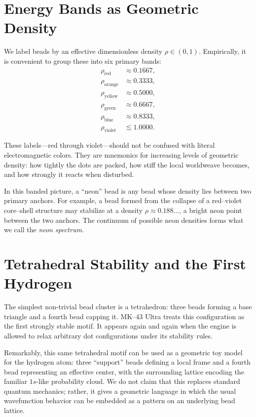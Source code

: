 \section{Energy Bands as Geometric Density}
We label beads by an effective dimensionless density $\rho \in (0,1)$.
Empirically, it is convenient to group these into six primary bands:
\begin{align}
\rho_{\text{red}} &\approx 0.1667,\\
\rho_{\text{orange}} &\approx 0.3333,\\
\rho_{\text{yellow}} &\approx 0.5000,\\
\rho_{\text{green}} &\approx 0.6667,\\
\rho_{\text{blue}} &\approx 0.8333,\\
\rho_{\text{violet}} &\lesssim 1.0000.
\end{align}

These labels---red through violet---should not be confused with literal
electromagnetic colors. They are mnemonics for increasing levels of geometric
density: how tightly the dots are packed, how stiff the local worldweave
becomes, and how strongly it reacts when disturbed.

In this banded picture, a ``neon'' bead is any bead whose density lies between
two primary anchors. For example, a bead formed from the collapse of a
red--violet core--shell structure may stabilize at a density
$\rho \approx 0.188\ldots$, a bright neon point between the two anchors.
The continuum of possible neon densities forms what we call the \emph{neon
spectrum}.

\section{Tetrahedral Stability and the First Hydrogen}
The simplest non-trivial bead cluster is a tetrahedron: three beads forming a
base triangle and a fourth bead capping it. MK--43 Ultra treats this
configuration as the first strongly stable motif. It appears again and again
when the engine is allowed to relax arbitrary dot configurations under its
stability rules.

Remarkably, this same tetrahedral motif can be used as a geometric toy model
for the hydrogen atom: three ``support'' beads defining a local frame and a
fourth bead representing an effective center, with the surrounding lattice
encoding the familiar $1s$-like probability cloud. We do not claim that this
replaces standard quantum mechanics; rather, it gives a geometric language in
which the usual wavefunction behavior can be embedded as a pattern on an
underlying bead lattice.

